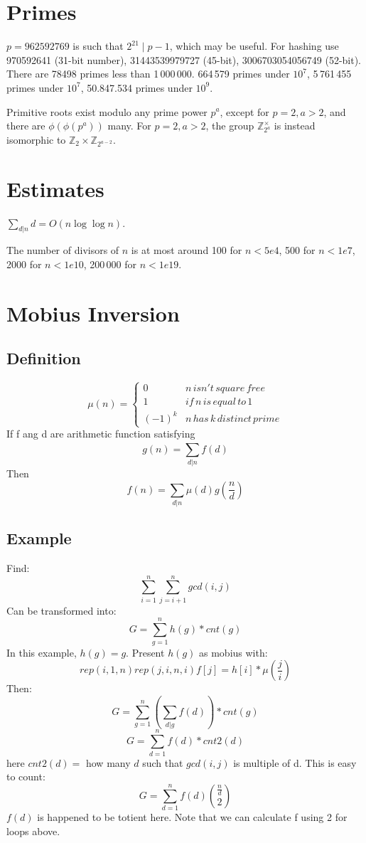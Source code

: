 \section{Primes}
$p=962592769$ is such that $2^{21} \mid p-1$, which may be useful. For hashing
use 970592641 (31-bit number), 31443539979727 (45-bit), 3006703054056749
(52-bit). There are 78498 primes less than 1\,000\,000. 664\,579 primes under $10^{7}$, 
5\,761\,455 primes under $10^{7}$, 50.847.534 primes under $10^{9}$.

Primitive roots exist modulo any prime power $p^a$, except for $p = 2, a > 2$, and there are $\phi(\phi(p^a))$ many.
For $p = 2, a > 2$, the group $\mathbb Z_{2^a}^\times$ is instead isomorphic to $\mathbb Z_2 \times \mathbb Z_{2^{a-2}}$.

\section{Estimates}
$\sum_{d|n} d = O(n \log \log n)$.

The number of divisors of $n$ is at most around 100 for $n < 5e4$, 500 for $n < 1e7$, 2000 for $n < 1e10$, 200\,000 for $n < 1e19$.

\section{Mobius Inversion}
\subsection{Definition}
\[\mu(n) =
	\left\{\begin{matrix}
	0 & n\,isn't\,square\,free\,\\ 
	1 & if\,n\,is\,equal\,to\,1  \\ 
	(-1)^{k} & n\,has\,k\,distinct\,prime    
	\end{matrix}\right.\]
	If f ang d are arithmetic function satisfying
	\[g(n)=\sum_{d|n}^{\,}f(d)\]
	Then
	\[f(n)=\sum_{d|n}^{\,}\mu(d)g(\frac{n}{d})\]
	\subsection{Example}
	Find:
	\[\sum_{i=1}^{n} \sum_{j=i+1}^{n} gcd(i,j)\]
	Can be transformed into:
	\[G = \sum_{g=1}^{n} h(g) * cnt(g)\]
	In this example, $h(g) = g$. Present $h(g)$ as mobius with:
	\[rep(i,1,n) rep(j,i,n,i) f[j]=h[i]*\mu(\frac{j}{i})\]
	Then:
	\[G = \sum_{g=1}^{n}(\sum_{d|g}f(d)) * cnt(g)\]
	\[G = \sum_{d=1}^{n} f(d) * cnt2(d)\] 
	here $cnt2(d) =$ how many $d$ such that $gcd(i,j)$ is multiple of d. This is easy to count:
	\[G = \sum_{d=1}^{n} f(d)\binom{\frac{n}{d}}{2}\] 
	$f(d)$ is happened to be totient here. Note that we can calculate f using 2 for loops above.
		
